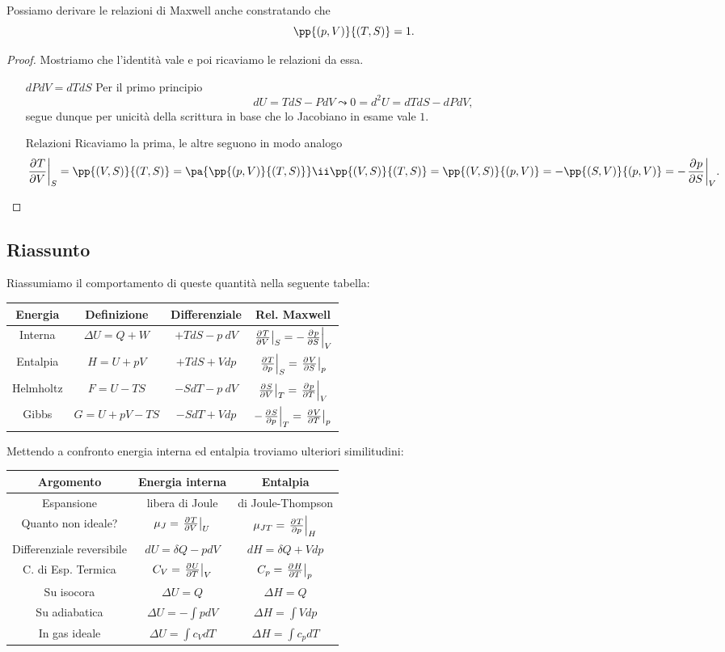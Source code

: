 \begin{remark}[Jacobiano $p,V$ - $T,S$]
Possiamo derivare le relazioni di Maxwell anche constratando che
\[\pp{(p,V)}{(T,S)}=1.\]
\end{remark}
\begin{proof}
Mostriamo che l'identit\`a vale e poi ricaviamo le relazioni da essa.
\setlength{\leftmargini}{0cm}
\begin{itemize}
\item[$\boxed{dPdV=dTdS}$] Per il primo principio
\[dU=TdS-PdV\leadsto 0=d^2U=dTdS-dPdV,\]
segue dunque per unicit\`a della scrittura in base che lo Jacobiano in esame vale $1$.
\item[$\boxed{\text{Relazioni}}$] Ricaviamo la prima, le altre seguono in modo analogo
\[\ppb VTS=\pp{(V,S)}{(T,S)}=\pa{\pp{(p,V)}{(T,S)}}\ii\pp{(V,S)}{(T,S)}=\pp{(V,S)}{(p,V)}=-\pp{(S,V)}{(p,V)}=-\ppb SpV.\]
\end{itemize}
\setlength{\leftmargini}{0.5cm}
\end{proof}




\subsection{Riassunto}
Riassumiamo il comportamento di queste quantit\`a nella seguente tabella:
\begin{center}
\begin{tabular}{|c||c|c|c|}
\hline
Energia & Definizione &Differenziale & Rel. Maxwell\\\hline
Interna & $\Delta U=Q+W$ & $+TdS-p\ dV$ & $\ppb VTS=-\ppb SpV$\\
Entalpia & $H=U+pV$ & $+TdS+Vdp$ & $\ppb pTS=\ppb SVp$\\
Helmholtz & $F=U-TS$ & $-SdT-p\ dV$ & $\ppb VST=\ppb TpV$\\
Gibbs & $G=U+pV-TS$ & $-SdT+Vdp$ & $-\ppb pST=\ppb TVp$\\\hline
\end{tabular}
\end{center}
Mettendo a confronto energia interna ed entalpia troviamo ulteriori similitudini:
\begingroup
\renewcommand{\arraystretch}{1.5}
\begin{center}
\begin{tabular}{|c||c||c|}
\hline
Argomento & Energia interna & Entalpia\\\hline\hline
Espansione & libera di Joule & di Joule-Thompson\\\hline
Quanto non ideale?& $\mu_J=\ppb VTU$ & $\mu_{JT}=\ppb pTH$\\\hline
Differenziale reversibile &$dU=\delta Q-pdV$ & $dH =\delta Q+Vdp$\\\hline
C. di Esp. Termica&$C_V=\ppb TUV$ & $C_p=\ppb THp$\\\hline
Su isocora & $\Delta U=Q$ & $\Delta H=Q$\\\hline
Su adiabatica & $\Delta U=-\int pdV$ &  $\Delta H=\int Vdp$\\\hline
In gas ideale & $\Delta U=\int c_VdT$ & $\Delta H=\int c_pdT$\\\hline
\end{tabular}
\end{center}
\endgroup

